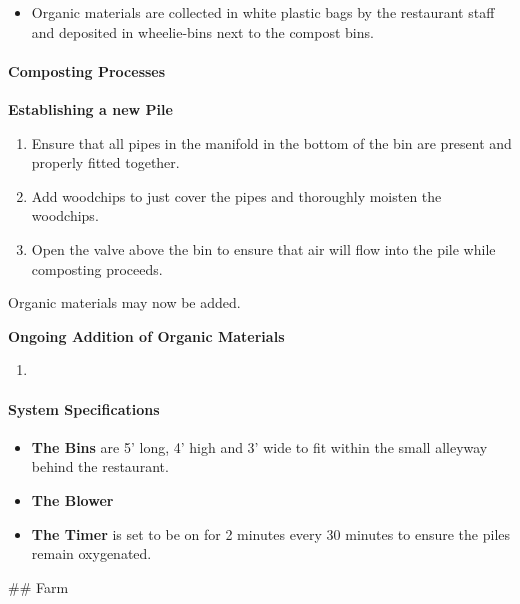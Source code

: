 \begin{itemize}
\tightlist
\item
  Organic materials are collected in white plastic bags by the
  restaurant staff and deposited in wheelie-bins next to the compost
  bins.
\end{itemize}

\paragraph{Composting Processes}\label{composting-processes}

\textbf{Establishing a new Pile}

\begin{enumerate}
\def\labelenumi{\arabic{enumi}.}
\tightlist
\item
  Ensure that all pipes in the manifold in the bottom of the bin are
  present and properly fitted together.
\item
  Add woodchips to just cover the pipes and thoroughly moisten the
  woodchips.
\item
  Open the valve above the bin to ensure that air will flow into the
  pile while composting proceeds.
\end{enumerate}

Organic materials may now be added.

\textbf{Ongoing Addition of Organic Materials}

\begin{enumerate}
\def\labelenumi{\arabic{enumi}.}
\item
\end{enumerate}

\paragraph{System Specifications}\label{system-specifications}

\begin{itemize}
\tightlist
\item
  \textbf{The Bins} are 5' long, 4' high and 3' wide to fit within the
  small alleyway behind the restaurant.
\item
  \textbf{The Blower}
\item
  \textbf{The Timer} is set to be on for 2 minutes every 30 minutes to
  ensure the piles remain oxygenated.
\end{itemize}

 \#\# Farm
